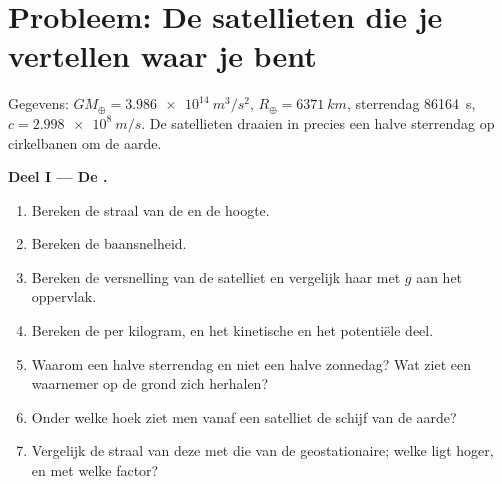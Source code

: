 \section{Probleem: De satellieten die je vertellen waar je bent}

\begin{problem}
\label{pb:b1:central-forces:1}
Gegevens: $GM_\oplus = \qty{3.986e14}{m^3/s^2}$, $R_\oplus = \qty{6371}{km}$,
sterrendag \qty{86164}{s}, $c = \qty{2.998e8}{m/s}$. De satellieten
draaien in precies een halve sterrendag op cirkelbanen om de aarde.

\medskip
\noindent\textbf{Deel I --- De .}
\begin{enumerate}
  \item Bereken de straal van de  en de hoogte.
  \item Bereken de baansnelheid.
  \item Bereken de versnelling van de satelliet en vergelijk haar met $g$ aan
        het oppervlak.
  \item Bereken de  per kilogram, en het kinetische en het
        potentiële deel.
  \item Waarom een halve sterrendag en niet een halve zonnedag? Wat ziet een
        waarnemer op de grond zich herhalen?
  \item Onder welke hoek ziet men vanaf een satelliet de schijf van de aarde?
  \item Vergelijk de straal van deze  met die van de geostationaire; welke
        ligt hoger, en met welke factor?
\end{enumerate}


\end{problem}
